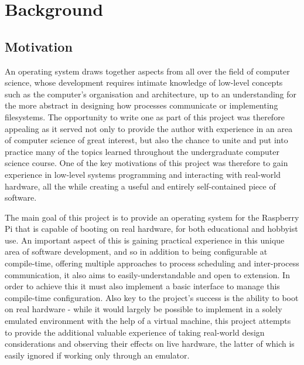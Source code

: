\section{Background}
\subsection{Motivation}
    An operating system draws together aspects from all over the field of
    computer science, whose development requires intimate knowledge of low-level
    concepts such as the computer's organisation and architecture, up to an
    understanding for the more abstract in designing how processes communicate
    or implementing filesystems. The opportunity to write one as part of this
    project was therefore appealing as it served not only to provide the author
    with experience in an area of computer science of great interest,
    but also the chance to unite and put into practice many of the topics
    learned throughout the undergraduate computer science course. One of the key
    motivations of this project was therefore to gain experience in low-level
    systems programming and interacting with real-world hardware, all the while
    creating a useful and entirely self-contained piece of software.

    The main goal of this project is to provide an operating system for the
    Raspberry Pi that is capable of booting on real hardware, for both
    educational and hobbyist use. An important aspect of this is gaining
    practical experience in this unique area of software development, and so in
    addition to being configurable at compile-time, offering multiple approaches
    to process scheduling and inter-process communication, it also aims to
    easily-understandable and open to extension. In order to achieve this it
    must also implement a basic interface to manage this compile-time
    configuration. Also key to the project's success is the ability to boot on
    real hardware - while it would largely be possible to implement in a solely
    emulated environment with the help of a virtual machine, this project
    attempts to provide the additional valuable experience of taking real-world
    design considerations and observing their effects on live hardware, the
    latter of which is easily ignored if working only through an emulator. 

